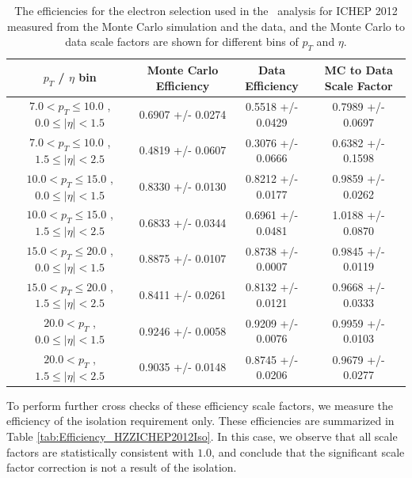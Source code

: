 \documentclass{cmspaper}
\begin{document}
 \begin{table}[!ht]
 \begin{center} 
 \begin{tabular}{|c|c|c|c|}
 \hline
 $p_{T}$ / $\eta$ bin    &  Monte Carlo Efficiency    &  Data Efficiency   &  MC to Data Scale Factor \\   \hline           
$  7.0 < p_{T} \le  10.0$ , $  0.0  \le |\eta| <   1.5$   &       0.6907 +/- 0.0274   &       0.5518 +/- 0.0429   &       0.7989 +/- 0.0697   \\   
\hline
$  7.0 < p_{T} \le  10.0$ , $  1.5  \le |\eta| <   2.5$   &       0.4819 +/- 0.0607   &       0.3076 +/- 0.0666   &       0.6382 +/- 0.1598   \\   
\hline
$ 10.0 < p_{T} \le  15.0$ , $  0.0  \le |\eta| <   1.5$   &       0.8330 +/- 0.0130   &       0.8212 +/- 0.0177   &       0.9859 +/- 0.0262   \\   
\hline
$ 10.0 < p_{T} \le  15.0$ , $  1.5  \le |\eta| <   2.5$   &       0.6833 +/- 0.0344   &       0.6961 +/- 0.0481   &       1.0188 +/- 0.0870   \\   
\hline
$ 15.0 < p_{T} \le  20.0$ , $  0.0  \le |\eta| <   1.5$   &       0.8875 +/- 0.0107   &       0.8738 +/- 0.0007   &       0.9845 +/- 0.0119   \\   
\hline
$ 15.0 < p_{T} \le  20.0$ , $  1.5  \le |\eta| <   2.5$   &       0.8411 +/- 0.0261   &       0.8132 +/- 0.0121   &       0.9668 +/- 0.0333   \\   
\hline
$ 20.0 < p_{T} $ , $  0.0  \le |\eta| <   1.5$   &       0.9246 +/- 0.0058   &       0.9209 +/- 0.0076   &       0.9959 +/- 0.0103   \\   
\hline
$ 20.0 < p_{T} $ , $  1.5  \le |\eta| <   2.5$   &       0.9035 +/- 0.0148   &       0.8745 +/- 0.0206   &       0.9679 +/- 0.0277   \\   
\hline
\end{tabular}
\caption{The efficiencies for the electron selection used in the \HiggsToZZ\ analysis for ICHEP 2012
measured from the Monte Carlo simulation and the data, and the Monte Carlo
to data scale factors are shown for different bins of $p_{T}$ and $\eta$. }
\label{tab:Efficiency_HZZICHEP2012WP}
\end{center}
\end{table}

To perform further cross checks of these efficiency scale factors, we measure the efficiency of the isolation
requirement only. These efficiencies are summarized in Table \ref{tab:Efficiency_HZZICHEP2012Iso}. In this case,
we observe that all scale factors are statistically consistent with $1.0$, and conclude that the significant scale 
factor correction is not a result of the isolation. 
\end{document}
